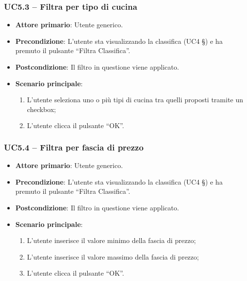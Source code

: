 \subsubsection{UC5.3 – Filtra per tipo di cucina}
\begin{itemize}
    \item \textbf{Attore primario}: Utente generico.
    \item \textbf{Precondizione}: L’utente sta visualizzando la classifica (UC4 §) e ha premuto il pulsante “Filtra Classifica”.
    \item \textbf{Postcondizione}: Il filtro in questione viene applicato.
    \item \textbf{Scenario principale}: 
    \begin{enumerate}
        \item L’utente seleziona uno o più tipi di cucina tra quelli proposti tramite un checkbox;
        \item L’utente clicca il pulsante “OK”.
    \end{enumerate}
\end{itemize}

\subsubsection{UC5.4 – Filtra per fascia di prezzo}
\begin{itemize}
    \item \textbf{Attore primario}: Utente generico.
    \item \textbf{Precondizione}: L’utente sta visualizzando la classifica (UC4 §) e ha premuto il pulsante “Filtra Classifica”.
    \item \textbf{Postcondizione}: Il filtro in questione viene applicato.
    \item \textbf{Scenario principale}: 
    \begin{enumerate}
        \item L’utente inserisce il valore minimo della fascia di prezzo;
        \item L’utente inserisce il valore massimo della fascia di prezzo;
        \item L’utente clicca il pulsante “OK”.
    \end{enumerate}
\end{itemize}

